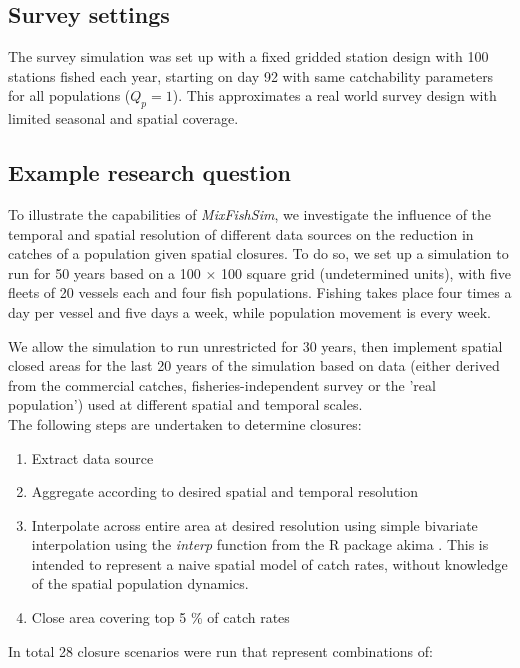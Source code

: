 \documentclass[review]{elsarticle}
\begin{document}
\subsection{Survey settings}

The survey simulation was set up with a fixed gridded station design with 100
stations fished each year, starting on day 92  with same catchability parameters for all
populations ($Q_{p} = 1$). This approximates a real world survey design with
limited seasonal and spatial coverage. 

\subsection{Example research question}

To illustrate the capabilities of \emph{MixFishSim}, we investigate the
influence of the temporal and spatial resolution of different data sources on
the reduction in catches of a population given spatial closures. To do so, we
set up a simulation to run for 50 years based on a 100 $\times$ 100 square grid
(undetermined units), with five fleets of 20 vessels each and four fish
populations. Fishing takes place four times a day per vessel and five days a
week, while population movement is every week.

We allow the simulation to run unrestricted for 30 years,
then implement spatial closed areas for the last 20 years of the simulation
based on data (either derived from the commercial catches,
fisheries-independent survey or the 'real population') used at different
spatial and temporal scales. \\

The following steps are undertaken to determine closures:
\begin{enumerate}
	\item Extract data source
	\item Aggregate according to desired spatial and temporal resolution
	\item Interpolate across entire area at desired resolution using simple
		bivariate interpolation using the \emph{interp} function from
		the R package akima \citep{Akima2006}. This is intended to
		represent a naive spatial model of catch rates, without
		knowledge of the spatial population dynamics.
	\item Close area covering top 5 \% of catch rates 
\end{enumerate}
In total 28 closure scenarios were run that represent combinations of:
\end{document}
